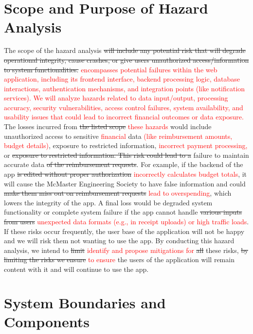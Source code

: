 \documentclass{article}
\begin{document}
\section{Scope and Purpose of Hazard Analysis}
The scope of the hazard analysis \sout{will include any potential risk that will degrade operational integrity, cause crashes, or give users unauthorized access/information to system functionalities.} \textcolor{red}{encompasses potential failures within the \progname{} web application, including its frontend interface, backend processing logic, database interactions, authentication mechanisms, and integration points (like notification services). We will analyze hazards related to data input/output, processing accuracy, security vulnerabilities, access control failures, system availability, and usability issues that could lead to incorrect financial outcomes or data exposure.} The losses incurred from \sout{the listed scope} \textcolor{red}{these hazards} would include unauthorized access to sensitive \textcolor{red}{financial} data \textcolor{red}{(like reimbursement amounts, budget details)}, exposure to restricted information, \textcolor{red}{incorrect payment processing,} or \sout{exposure to restricted information. This risk could lead to a} failure to maintain accurate data \sout{of the reimbursement requests}. For example, if the backend of the app \sout{is edited without proper authorization} \textcolor{red}{incorrectly calculates budget totals}, it will cause the McMaster Engineering Society to have false information and could \sout{make them miss out on reimbursement requests} \textcolor{red}{lead to overspending}, which lowers the integrity of the app. A final loss would be degraded system functionality or complete system failure if the app cannot handle \sout{various inputs from users} \textcolor{red}{unexpected data formats (e.g., in receipt uploads) or high traffic loads}. If these risks occur frequently, the user base of the application will not be happy and we will risk them not wanting to use the app. By conducting this hazard analysis, we intend to \sout{limit} \textcolor{red}{identify and propose mitigations for} \sout{all} these risks, \sout{by limiting the risks we ensure} \textcolor{red}{to ensure} the users of the application will remain content with it and will continue to use the app.

\section{System Boundaries and Components}
\end{document}
